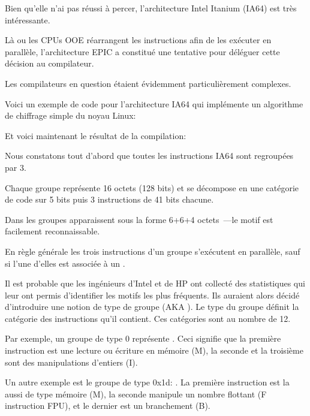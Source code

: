 ﻿
\label{itanium}

Bien qu'elle n'ai pas réussi à percer, l'architecture  Intel Itanium (\ac{IA64}) est très intéressante.

Là ou les CPUs \ac{OOE} réarrangent les instructions afin de les exécuter en parallèle, l'architecture 
\ac{EPIC} a constitué une tentative pour déléguer cette décision au compilateur.

Les compilateurs en question étaient évidemment particulièrement complexes.

Voici un exemple de code pour l'architecture \ac{IA64} qui implémente un algorithme de 
chiffrage simple du noyau Linux:



Et voici maintenant le résultat de la compilation:



Nous constatons tout d'abord que toutes les instructions \ac{IA64} sont regroupées par 3.

Chaque groupe représente 16 octets (128 bits) et se décompose en une catégorie de code sur 5 bits 
puis 3 instructions de 41 bits chacune.

Dans \IDA les groupes apparaissent sous la forme 6+6+4 octets~---le motif est facilement 
reconnaissable.

En règle générale les trois instructions d'un groupe s'exécutent en parallèle, sauf si l'une d'elles 
est associée à un .

Il est probable que les ingénieurs d'Intel et de HP ont collecté des statistiques qui leur ont permis 
d'identifier les motifs les plus fréquents. Ils auraient alors décidé d'introduire une notion de 
type de groupe (\ac{AKA} ). Le type du groupe définit la catégorie des instructions 
qu'il contient. Ces catégories sont au nombre de 12.

Par exemple, un groupe de type 0 représente . Ceci signifie que la première instruction est 
une lecture ou écriture en mémoire (M), la seconde et la troisième sont des manipulations d'entiers 
(I).

Un autre exemple est le groupe de type 0x1d: . La première instruction est la aussi de type 
mémoire (M), la seconde manipule un nombre flottant (F instruction \ac{FPU}), et le dernier est un 
branchement (B).

